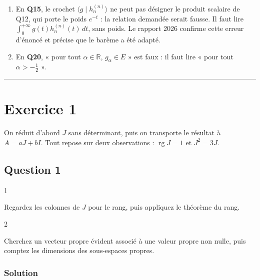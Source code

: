 \documentclass[11pt,a4paper]{article}
\providecommand{\tightlist}{\setlength{\itemsep}{0pt}\setlength{\parskip}{0pt}}
\begin{document}
\begin{enumerate}
\def\labelenumi{\arabic{enumi}.}
\tightlist
\item
  En \textbf{Q15}, le crochet \(\langle g\mid h_n^{(n)}\rangle\) ne peut pas désigner le produit scalaire de Q12, qui porte le poids \(e^{-t}\) : la relation demandée serait fausse. Il faut lire \(\int_0^{+\infty}g(t)h_n^{(n)}(t)\,dt\), sans poids. Le rapport 2026 confirme cette erreur d'énoncé et précise que le barème a été adapté.
\item
  En \textbf{Q20}, « pour tout \(\alpha\in\mathbb R\), \(g_\alpha\in E\) » est faux : il faut lire « pour tout \(\alpha>-\frac12\) ».
\end{enumerate}

\begin{center}\rule{0.5\linewidth}{0.5pt}\end{center}

\hypertarget{exercice-1}{%
\section{Exercice 1}\label{exercice-1}}

On réduit d'abord \(J\) sans déterminant, puis on transporte le résultat à \(A=aJ+bI\). Tout repose sur deux observations : \(\operatorname{rg}J=1\) et \(J^2=3J\).

\hypertarget{question-1}{%
\subsection{Question 1}\label{question-1}}

\begin{indication}{1}

Regardez les colonnes de \(J\) pour le rang, puis appliquez le théorème du rang.

\end{indication}

\begin{indication}{2}

Cherchez un vecteur propre évident associé à une valeur propre non nulle, puis comptez les dimensions des sous-espaces propres.

\end{indication}

\hypertarget{solution}{%
\subsubsection{Solution}\label{solution}}
\end{document}
